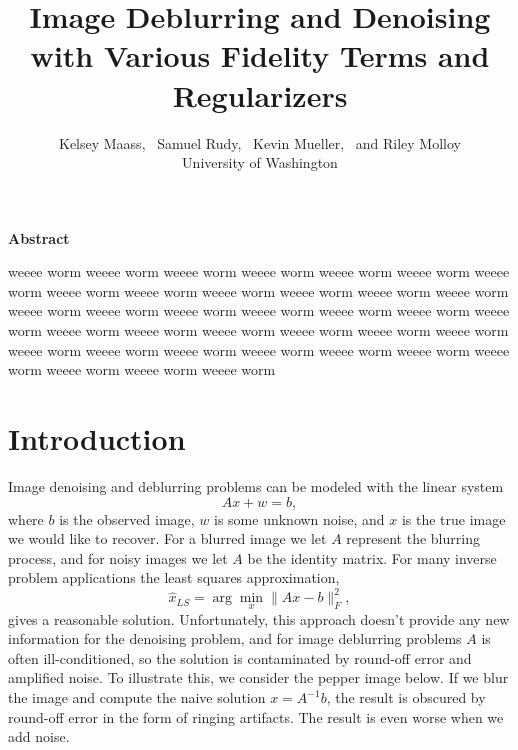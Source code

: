 \documentclass[10pt,a4paper]{article}
\begin{document}
\title{Image Deblurring and Denoising \\with Various Fidelity Terms and Regularizers}
\author{
Kelsey Maass, ~Samuel Rudy, ~Kevin Mueller, ~and Riley Molloy\\
University of Washington\\
}

\maketitle

\begin{center}
\begin{minipage}{0.8\textwidth}
\begin{center}
\textbf{Abstract}
\end{center}
weeee worm weeee worm weeee worm weeee worm weeee worm weeee worm weeee worm weeee worm weeee worm weeee worm weeee worm weeee worm weeee worm weeee worm weeee worm weeee worm weeee worm weeee worm weeee worm weeee worm weeee worm weeee worm weeee worm weeee worm weeee worm weeee worm weeee worm weeee worm weeee worm weeee worm weeee worm weeee worm weeee worm weeee worm weeee worm weeee worm 
\end{minipage}
\end{center}

\section{Introduction}
Image denoising and deblurring problems can be modeled with the linear system
\begin{equation}
Ax + w = b,
\end{equation}
where $b$ is the observed image, $w$ is some unknown noise, and $x$ is the true image we would like to recover. For a blurred image we let $A$ represent the blurring process, and for noisy images we let $A$ be the identity matrix. For many inverse problem applications the least squares approximation, 
\begin{equation}
\hat{x}_{LS} = \arg\min_x \| Ax - b \|_F^2 ,
\end{equation}
gives a reasonable solution. Unfortunately, this approach doesn't provide any new information for the denoising problem, and for image deblurring problems $A$ is often ill-conditioned, so the solution is contaminated by round-off error and amplified noise. To illustrate this, we consider the pepper image below. If we blur the image and compute the naive solution $x = A^{-1}b$, the result is obscured by round-off error in the form of ringing artifacts. The result is even worse when we add noise.
\end{document}
